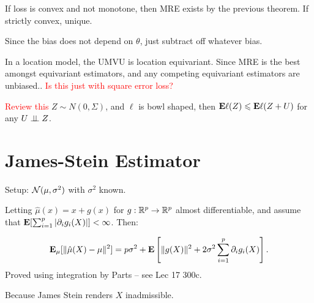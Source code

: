 \documentclass{article}
\newcommand\myworries[1]{\textcolor{red}{#1}}
\begin{document}
\begin{theorem}
If loss is convex and not monotone, then MRE exists by the previous theorem. If strictly convex, unique. 
\end{theorem}





\begin{fact}
Since the bias does not depend on $\theta$, just subtract off whatever bias. 
\end{fact}

\begin{fact}
In a location model, the UMVU is location equivariant. Since MRE is the best amongst equivariant estimators, and any competing equivariant estimators are unbiased..
\myworries{Is this just with square error loss?}

\end{fact}


\begin{theorem}
\myworries{Review this}
$Z\sim N(0,\Sigma)$, and $\ell$ is bowl shaped, then $\mathbf{E} \ell (Z) \leqslant \mathbf{E} \ell (Z+U)$ for any $U\perp \! \! \! \perp Z$. 
\end{theorem}

 \begin{definition}
\end{definition}
\begin{theorem}
\end{theorem}

\section{James-Stein Estimator}
Setup: $\mathcal N(\mu,\sigma^2)$ with $\sigma^2$ known. 

\begin{theorem}
Letting $\hat \mu(x) = x+g(x)$ for $g: \mathbb R^p \to \mathbb R^p$ almost differentiable, and assume that $\mathbf{E}[\sum_{i=1}^p |\partial_i g_i (X)|] <\infty$. Then:

$$\mathbf{E}_\mu[\|\hat \mu(X) - \mu\|^2] = p\sigma^2 + \mathbf{E}\left[\|g(X)\|^2 + 2\sigma^2 \sum_{i=1}^p \partial_i g_i(X)\right].$$
Proved using integration by Parts -- see Lec 17 300c.
\end{theorem}
\begin{fact}
Because James Stein renders $X$ inadmissible. 	
\end{fact}
\end{document}
